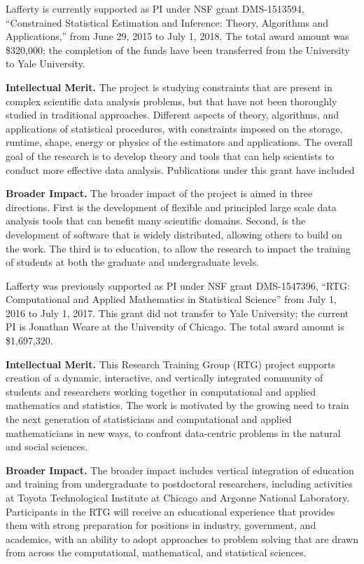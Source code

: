 \vskip10pt
\noindent
Lafferty is currently supported as PI under NSF grant DMS-1513594,
``Constrained Statistical Estimation and Inference: Theory, Algorithms
and Applications,'' from June 29, 2015 to July 1, 2018. The
total award amount was \$320,000; the completion of the funds have
been transferred from the University to Yale University.

{\bf Intellectual Merit.}  The project is studying constraints that
are present in complex scientific data analysis problems, but that
have not been thoroughly studied in traditional approaches. Different
aspects of theory, algorithms, and applications of statistical
procedures, with constraints imposed on the storage, runtime, shape,
energy or physics of the estimators and applications. The overall goal
of the research is to develop theory and tools that can help
scientists to conduct more effective data analysis. Publications 
under this grant have included 
\citep{ChatterjeeL18,MishraILH18,
abs-1803-01302,MishraLH17,YangB0L16,ChatterjeeDLZ16,ZhengL16,MishraZLH15,ZhengL15,ZhuL14}


{\bf Broader Impact.}  
The broader impact of the project is aimed in three directions.
First is the development of flexible and principled
large scale data analysis tools that can benefit many
scientific domains.  Second, is the development of software
that is widely distributed, allowing others to build on the work.
The third is to education, to allow the research to impact
the training of students at both the graduate and undergraduate
levels.


\vskip10pt
\noindent
Lafferty was previously supported as PI under NSF grant DMS-1547396,
``RTG: Computational and Applied Mathematics in Statistical Science''
from July 1, 2016 to July 1, 2017. This grant did not transfer
to Yale University; the current PI is Jonathan Weare at the 
University of Chicago. The total award amount is \$1,697,320.

{\bf Intellectual Merit.}  This Research Training Group (RTG) project
supports creation of a dynamic, interactive, and vertically integrated
community of students and researchers working together in
computational and applied mathematics and statistics. The work is
motivated by the growing need to train the next generation of
statisticians and computational and applied mathematicians in new
ways, to confront data-centric problems in the natural and social
sciences.

{\bf Broader Impact.}  
The broader impact includes vertical integration 
of education and training from undergraduate to postdoctoral
researchers, including activities at 
Toyota Technological Institute at Chicago and Argonne
National Laboratory. Participants in the RTG
will receive an educational experience that provides them with strong
preparation for positions in industry, government, and academics, with
an ability to adopt approaches to problem solving that are drawn from
across the computational, mathematical, and statistical sciences.

